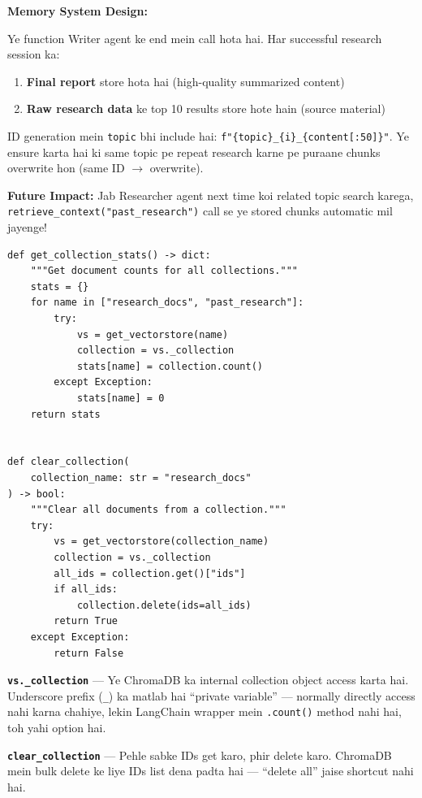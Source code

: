 \documentclass[12pt, a4paper]{article}
\begin{document}
\begin{codestorybox}
\textbf{Memory System Design:}

Ye function Writer agent ke end mein call hota hai. Har successful research session ka:
\begin{enumerate}
\item \textbf{Final report} store hota hai (high-quality summarized content)
\item \textbf{Raw research data} ke top 10 results store hote hain (source material)
\end{enumerate}

ID generation mein \texttt{topic} bhi include hai: \texttt{f"\{topic\}\_\{i\}\_\{content[:50]\}"}. Ye ensure karta hai ki same topic pe repeat research karne pe puraane chunks overwrite hon (same ID $\rightarrow$ overwrite).

\textbf{Future Impact:} Jab Researcher agent next time koi related topic search karega, \texttt{retrieve\_context("past\_research")} call se ye stored chunks automatic mil jayenge!
\end{codestorybox}

\begin{lstlisting}[style=pythonstyle, title={\color{accentgreen}\faIcon{file} Utility Functions}]
def get_collection_stats() -> dict:
    """Get document counts for all collections."""
    stats = {}
    for name in ["research_docs", "past_research"]:
        try:
            vs = get_vectorstore(name)
            collection = vs._collection
            stats[name] = collection.count()
        except Exception:
            stats[name] = 0
    return stats


def clear_collection(
    collection_name: str = "research_docs"
) -> bool:
    """Clear all documents from a collection."""
    try:
        vs = get_vectorstore(collection_name)
        collection = vs._collection
        all_ids = collection.get()["ids"]
        if all_ids:
            collection.delete(ids=all_ids)
        return True
    except Exception:
        return False
\end{lstlisting}

\begin{codestorybox}
\textbf{\texttt{vs.\_collection}} --- Ye ChromaDB ka internal collection object access karta hai. Underscore prefix (\texttt{\_}) ka matlab hai ``private variable'' --- normally directly access nahi karna chahiye, lekin LangChain wrapper mein \texttt{.count()} method nahi hai, toh yahi option hai.

\textbf{\texttt{clear\_collection}} --- Pehle sabke IDs get karo, phir delete karo. ChromaDB mein bulk delete ke liye IDs list dena padta hai --- ``delete all'' jaise shortcut nahi hai.
\end{codestorybox}
\end{document}
